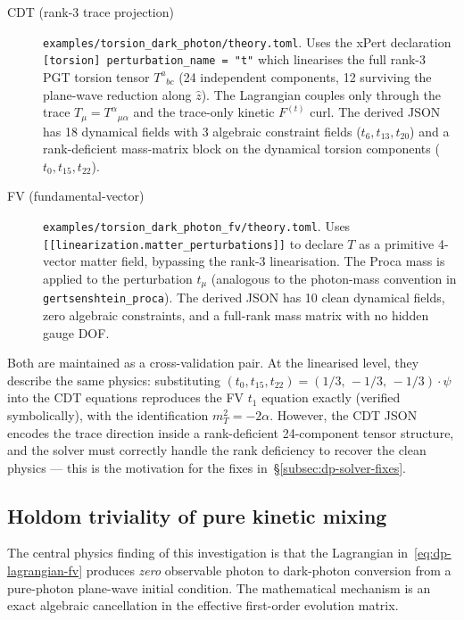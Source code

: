 \begin{description}
  \item[CDT (rank-3 trace projection)]
    \texttt{examples/torsion\_dark\_photon/theory.toml}. Uses the
    xPert declaration \texttt{[torsion] perturbation\_name = "t"}
    which linearises the full rank-3 PGT torsion tensor
    $T^a{}_{bc}$ (24 independent components, 12 surviving the
    plane-wave reduction along $\hat{z}$). The Lagrangian couples
    only through the trace $T_\mu = T^\alpha{}_{\mu\alpha}$ and the
    trace-only kinetic $F^{(t)}$ curl. The derived JSON has 18
    dynamical fields with 3 algebraic constraint fields
    ($t_6, t_{13}, t_{20}$) and a rank-deficient mass-matrix block
    on the dynamical torsion components ($t_0, t_{15}, t_{22}$).
  \item[FV (fundamental-vector)]
    \texttt{examples/torsion\_dark\_photon\_fv/theory.toml}. Uses
    \texttt{[[linearization.matter\_perturbations]]} to declare $T$
    as a primitive 4-vector matter field, bypassing the rank-3
    linearisation. The Proca mass is applied to the perturbation
    $t_\mu$ (analogous to the photon-mass convention in
    \texttt{gertsenshtein\_proca}). The derived JSON has 10 clean
    dynamical fields, zero algebraic constraints, and a full-rank
    mass matrix with no hidden gauge DOF.
\end{description}

Both are maintained as a cross-validation pair. At the linearised
level, they describe the same physics: substituting
$(t_0, t_{15}, t_{22}) = (1/3,\, -1/3,\, -1/3)\cdot\psi$ into the CDT
equations reproduces the FV $t_1$ equation exactly (verified
symbolically), with the identification $m_T^2 = -2\alpha$. However,
the CDT JSON encodes the trace direction inside a rank-deficient
24-component tensor structure, and the solver must correctly handle
the rank deficiency to recover the clean physics --- this is the
motivation for the fixes in~\S\ref{subsec:dp-solver-fixes}.

\subsection{Holdom triviality of pure kinetic mixing}
\label{subsec:dp-holdom-algebra}

The central physics finding of this investigation is that the
Lagrangian in~\eqref{eq:dp-lagrangian-fv} produces \emph{zero}
observable photon to dark-photon conversion from a pure-photon
plane-wave initial condition. The mathematical mechanism is an exact
algebraic cancellation in the effective first-order evolution matrix.

